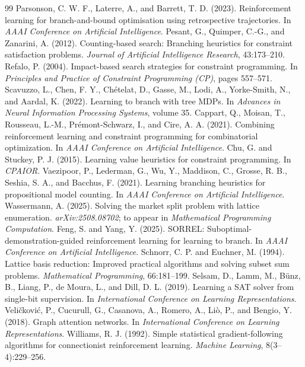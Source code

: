 \documentclass[final,5p,times,twocolumn]{elsarticle}
\begin{document}
\begin{thebibliography}{99}
 Parsonson, C. W. F., Laterre, A., and Barrett, T. D. (2023). Reinforcement learning for branch-and-bound optimisation using retrospective trajectories. In \emph{AAAI Conference on Artificial Intelligence}.
 Pesant, G., Quimper, C.-G., and Zanarini, A. (2012). Counting-based search: Branching heuristics for constraint satisfaction problems. \emph{Journal of Artificial Intelligence Research}, 43:173--210.
 Refalo, P. (2004). Impact-based search strategies for constraint programming. In \emph{Principles and Practice of Constraint Programming (CP)}, pages 557--571.
 Scavuzzo, L., Chen, F. Y., Ch\'etelat, D., Gasse, M., Lodi, A., Yorke-Smith, N., and Aardal, K. (2022). Learning to branch with tree MDPs. In \emph{Advances in Neural Information Processing Systems}, volume 35.
 Cappart, Q., Moisan, T., Rousseau, L.-M., Pr\'emont-Schwarz, I., and Cire, A. A. (2021). Combining reinforcement learning and constraint programming for combinatorial optimization. In \emph{AAAI Conference on Artificial Intelligence}.
 Chu, G. and Stuckey, P. J. (2015). Learning value heuristics for constraint programming. In \emph{CPAIOR}.
 Vaezipoor, P., Lederman, G., Wu, Y., Maddison, C., Grosse, R. B., Seshia, S. A., and Bacchus, F. (2021). Learning branching heuristics for propositional model counting. In \emph{AAAI Conference on Artificial Intelligence}.
 Wassermann, A. (2025). Solving the market split problem with lattice enumeration. \emph{arXiv:2508.08702}; to appear in \emph{Mathematical Programming Computation}.
 Feng, S. and Yang, Y. (2025). SORREL: Suboptimal-demonstration-guided reinforcement learning for learning to branch. In \emph{AAAI Conference on Artificial Intelligence}.
 Schnorr, C. P. and Euchner, M. (1994). Lattice basis reduction: Improved practical algorithms and solving subset sum problems. \emph{Mathematical Programming}, 66:181--199.
 Selsam, D., Lamm, M., B\"unz, B., Liang, P., de Moura, L., and Dill, D. L. (2019). Learning a SAT solver from single-bit supervision. In \emph{International Conference on Learning Representations}.
 Veli\v{c}kovi\'c, P., Cucurull, G., Casanova, A., Romero, A., Li\`o, P., and Bengio, Y. (2018). Graph attention networks. In \emph{International Conference on Learning Representations}.
 Williams, R. J. (1992). Simple statistical gradient-following algorithms for connectionist reinforcement learning. \emph{Machine Learning}, 8(3--4):229--256.
\end{thebibliography}
\end{document}
